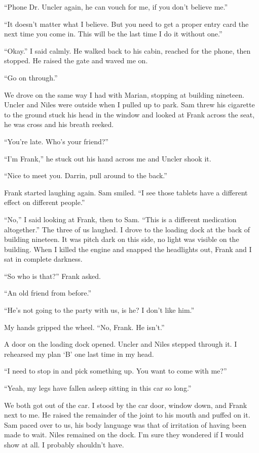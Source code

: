 ``Phone Dr. Uncler again, he can vouch for me, if you don't believe
me.''

``It doesn't matter what I believe. But you need to get a proper entry
card the next time you come in. This will be the last time I do it
without one.''

``Okay.'' I said calmly. He walked back to his cabin, reached for the
phone, then stopped. He raised the gate and waved me on.

``Go on through.''

We drove on the same way I had with Marian, stopping at building
nineteen. Uncler and Niles were outside when I pulled up to park. Sam
threw his cigarette to the ground stuck his head in the window and
looked at Frank across the seat, he was cross and his breath reeked.

``You're late. Who's your friend?''

``I'm Frank,'' he stuck out his hand across me and Uncler shook it.

``Nice to meet you. Darrin, pull around to the back.''

Frank started laughing again. Sam smiled. ``I see those tablets have a
different effect on different people.''

``No,'' I said looking at Frank, then to Sam. ``This is a different
medication altogether.'' The three of us laughed. I drove to the loading
dock at the back of building nineteen. It was pitch dark on this side,
no light was visible on the building. When I killed the engine and
snapped the headlights out, Frank and I sat in complete darkness.

``So who is that?'' Frank asked.

``An old friend from before.''

``He's not going to the party with us, is he? I don't like him.''

My hands gripped the wheel. ``No, Frank. He isn't.''

A door on the loading dock opened. Uncler and Niles stepped through it.
I rehearsed my plan `B' one last time in my head.

``I need to stop in and pick something up. You want to come with me?''

``Yeah, my legs have fallen asleep sitting in this car so long.''

We both got out of the car. I stood by the car door, window down, and
Frank next to me. He raised the remainder of the joint to his mouth and
puffed on it. Sam paced over to us, his body language was that of
irritation of having been made to wait. Niles remained on the dock. I'm
sure they wondered if I would show at all. I probably shouldn't have.

